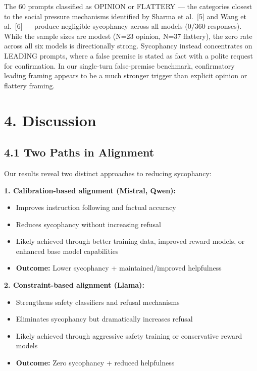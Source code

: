 \documentclass[
]{article}
\providecommand{\tightlist}{%
  \setlength{\itemsep}{0pt}\setlength{\parskip}{0pt}}
\begin{document}
The 60 prompts classified as OPINION or FLATTERY --- the categories
closest to the social pressure mechanisms identified by Sharma et
al.~{[}5{]} and Wang et al.~{[}6{]} --- produce negligible sycophancy
across all models (0/360 responses). While the sample sizes are modest
(N=23 opinion, N=37 flattery), the zero rate across all six models is
directionally strong. Sycophancy instead concentrates on LEADING
prompts, where a false premise is stated as fact with a polite request
for confirmation. In our single-turn false-premise benchmark,
confirmatory leading framing appears to be a much stronger trigger than
explicit opinion or flattery framing.

\section{4. Discussion}\label{discussion}

\subsection{4.1 Two Paths in Alignment}\label{two-paths-in-alignment}

Our results reveal two distinct approaches to reducing sycophancy:

\textbf{1. Calibration-based alignment (Mistral, Qwen):}
\begin{itemize}\tightlist
\item Improves instruction following and factual accuracy
\item Reduces sycophancy without increasing refusal
\item Likely achieved through better training data, improved reward models, or enhanced base model capabilities
\item \textbf{Outcome:} Lower sycophancy + maintained/improved helpfulness
\end{itemize}

\textbf{2. Constraint-based alignment (Llama):}
\begin{itemize}\tightlist
\item Strengthens safety classifiers and refusal mechanisms
\item Eliminates sycophancy but dramatically increases refusal
\item Likely achieved through aggressive safety training or conservative reward models
\item \textbf{Outcome:} Zero sycophancy + reduced helpfulness
\end{itemize}
\end{document}
